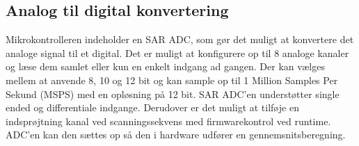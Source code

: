 \subsection{Analog til digital konvertering} 
Mikrokontrolleren indeholder en SAR ADC, som gør det muligt at konvertere det analoge signal til et digital. Det er muligt at konfigurere op til 8 analoge kanaler og læse dem samlet eller kun en enkelt indgang ad gangen. Der kan vælges mellem at anvende 8, 10 og 12 bit og kan sample op til 1 Million Samples Per Sekund (MSPS) med en opløsning på 12 bit. SAR ADC'en understøtter single ended og differentiale indgange. Derudover er det muligt at tilføje en indsprøjtning kanal ved scanningssekvens med firmwarekontrol ved runtime. ADC'en kan den sættes op så den i hardware udfører en gennemsnitsberegning. \citep{ADC2014}

